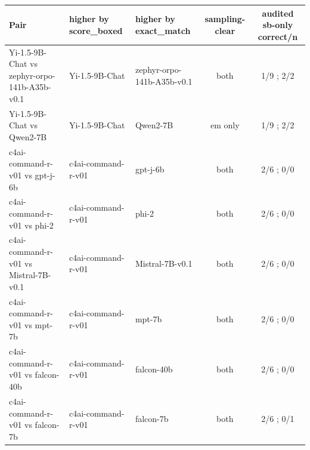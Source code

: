 \begin{tabular}{@{}lllcc@{}}
\toprule
Pair & higher by score\_boxed & higher by exact\_match & sampling-clear & audited sb-only correct/n \\
\midrule
Yi-1.5-9B-Chat vs zephyr-orpo-141b-A35b-v0.1 & Yi-1.5-9B-Chat & zephyr-orpo-141b-A35b-v0.1 & both & 1/9 ; 2/2 \\
Yi-1.5-9B-Chat vs Qwen2-7B & Yi-1.5-9B-Chat & Qwen2-7B & em only & 1/9 ; 2/2 \\
c4ai-command-r-v01 vs gpt-j-6b & c4ai-command-r-v01 & gpt-j-6b & both & 2/6 ; 0/0 \\
c4ai-command-r-v01 vs phi-2 & c4ai-command-r-v01 & phi-2 & both & 2/6 ; 0/0 \\
c4ai-command-r-v01 vs Mistral-7B-v0.1 & c4ai-command-r-v01 & Mistral-7B-v0.1 & both & 2/6 ; 0/0 \\
c4ai-command-r-v01 vs mpt-7b & c4ai-command-r-v01 & mpt-7b & both & 2/6 ; 0/0 \\
c4ai-command-r-v01 vs falcon-40b & c4ai-command-r-v01 & falcon-40b & both & 2/6 ; 0/0 \\
c4ai-command-r-v01 vs falcon-7b & c4ai-command-r-v01 & falcon-7b & both & 2/6 ; 0/1 \\
\bottomrule
\end{tabular}
